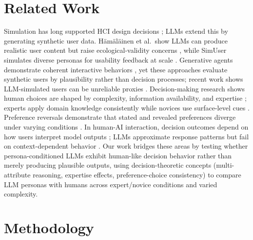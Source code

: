 \documentclass[manuscript,review]{acmart}
\begin{document}
\section{Related Work}
Simulation has long supported HCI design decisions \cite{murraysmith2022simulation}; LLMs extend this by generating synthetic user data. H\"am\"al\"ainen et al.\ show LLMs can produce realistic user content but raise ecological-validity concerns \cite{hamalainen2023synthetichci}, while SimUser simulates diverse personas for usability feedback at scale \cite{xiang2024simuser}. Generative agents demonstrate coherent interactive behaviors \cite{park2023generativeagents}, yet these approaches evaluate synthetic users by plausibility rather than decision processes; recent work shows LLM-simulated users can be unreliable proxies \cite{lostinsimulation2024, salminen2025syntheticusers}. Decision-making research shows human choices are shaped by complexity, information availability, and expertise \cite{payne1993adaptive}; experts apply domain knowledge consistently while novices use surface-level cues \cite{chi1988nature, shanteau1992competence}. Preference reversals demonstrate that stated and revealed preferences diverge under varying conditions \cite{slovic1983preference}. In human-AI interaction, decision outcomes depend on how users interpret model outputs \cite{bansal2021does}; LLMs approximate response patterns but fail on context-dependent behavior \cite{argyle2023out}. Our work bridges these areas by testing whether persona-conditioned LLMs exhibit human-like decision behavior rather than merely producing plausible outputs, using decision-theoretic concepts (multi-attribute reasoning, expertise effects, preference-choice consistency) to compare LLM personas with humans across expert/novice conditions and varied complexity.

\section{Methodology}
\end{document}
